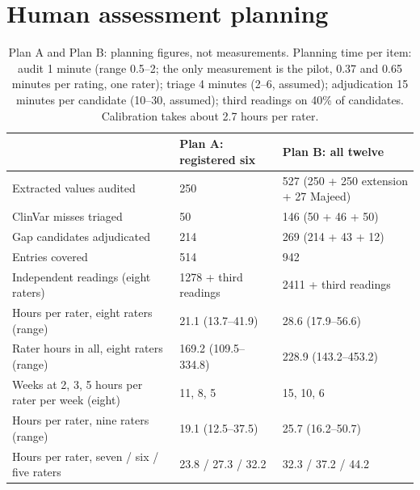 \documentclass{article} %
\begin{document}
\section{Human assessment planning}
\label{app:planning}
\begin{table}[!htbp]
\caption{Plan A and Plan B: planning figures, not measurements. Planning time per item: audit 1 minute (range 0.5--2; the only measurement is the pilot, 0.37 and 0.65 minutes per rating, one rater); triage 4 minutes (2--6, assumed); adjudication 15 minutes per candidate (10--30, assumed); third readings on 40\% of candidates. Calibration takes about 2.7 hours per rater.}
\begin{center}
\scriptsize
\begin{tabular}{lll}
\toprule
 & Plan A: registered six & Plan B: all twelve \\
\midrule
Extracted values audited & 250 & 527 (250 + 250 extension + 27 Majeed) \\
ClinVar misses triaged & 50 & 146 (50 + 46 + 50) \\
Gap candidates adjudicated & 214 & 269 (214 + 43 + 12) \\
Entries covered & 514 & 942 \\
Independent readings (eight raters) & 1278 + third readings & 2411 + third readings \\
Hours per rater, eight raters (range) & 21.1 (13.7--41.9) & 28.6 (17.9--56.6) \\
Rater hours in all, eight raters (range) & 169.2 (109.5--334.8) & 228.9 (143.2--453.2) \\
Weeks at 2, 3, 5 hours per rater per week (eight) & 11, 8, 5 & 15, 10, 6 \\
Hours per rater, nine raters (range) & 19.1 (12.5--37.5) & 25.7 (16.2--50.7) \\
Hours per rater, seven / six / five raters & 23.8 / 27.3 / 32.2 & 32.3 / 37.2 / 44.2 \\
\bottomrule
\end{tabular}
\end{center}
\end{table}
\end{document}
